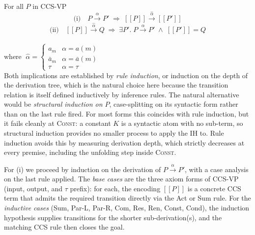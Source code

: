 \documentclass{article}
\newcommand{\enc}{[\![}
\newcommand{\cne}{]\!]}
\begin{document}







For all $P$ in CCS-VP
\\[2em]
\[\text{(i)}\quad P \xrightarrow{\alpha} P' \;\Longrightarrow\; \enc P\cne \xrightarrow{\hat\alpha} \enc P'\cne\]
\[\text{(ii)}\quad \enc P\cne \xrightarrow{\hat\alpha} Q \;\Longrightarrow\; \exists P'.\; P \xrightarrow{\alpha} P' \;\wedge\; \enc P'\cne = Q\]
\\[2em]
\(\text{where }\;\hat\alpha = \begin{cases} a_m & \alpha = a(m) \\ \bar{a}_m & \alpha = \bar{a}(m) \\ \tau & \alpha = \tau \end{cases}\)
\\[2em]


Both implications are established by \emph{rule induction}, or induction on the depth of
the derivation tree, which is the natural choice here because the transition relation
is itself defined inductively by inference rules. The natural alternative would be 
\emph{structural induction on $P$}, case-splitting on its syntactic form rather than 
on the last rule fired. For most forms this coincides with rule induction, but it fails 
cleanly at \textsc{Const}: a constant $K$ is a syntactic atom with no sub-term, so structural
induction provides no smaller process to apply the IH to. Rule induction avoids this by
measuring derivation depth, which strictly decreases at every premise, including the 
unfolding step inside \textsc{Const}.

For (i) we proceed by induction on the derivation of $P \xrightarrow{\alpha} P'$, with a case
analysis on the last rule applied. The \emph{base cases} are the three axiom forms 
of CCS-VP (input, output, and $\tau$ prefix): for each, the encoding $\enc P \cne$ is 
a concrete CCS term that admits the required transition directly via the Act or Sum rule.
For the \emph{inductive cases} (Sum, Par-L, Par-R, Com, Res, Ren, Const, Cond), the
induction hypothesis supplies transitions for the shorter sub-derivation(s), and the
matching CCS rule then closes the goal.
\end{document}
